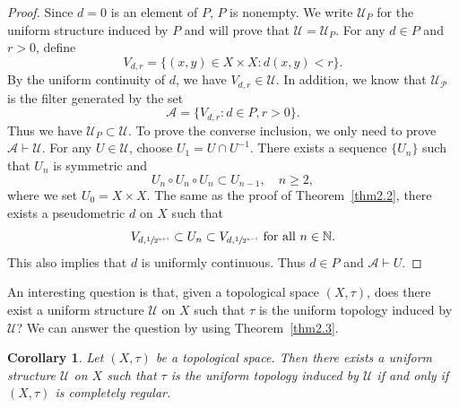 \documentclass[12pt,a4paper,draft]{article}  %
\newtheorem{corollary}{Corollary}[section]
\theoremstyle{definition}
\numberwithin{equation}{section}
\newcommand{\NN}{\mathbb{N}}
\begin{document}
\begin{proof}
    Since $d=0$ is an element of $P$, $P$ is nonempty.
    We write $\mathcal{U}_P$ for the uniform structure induced by $P$
    and will prove that $\mathcal{U}=\mathcal{U}_P$.
    For any $d \in P$ and $r > 0$, define
    $$ V_{d,r} = \{(x,y) \in X \times X: d(x,y) < r\}. $$
    By the uniform continuity of $d$, we have $V_{d,r} \in \mathcal{U}$.
    In addition, we know that $\mathcal{U_P}$ is the filter generated by the set
    $$ \mathcal{A}=\{V_{d,r}: d \in P, r > 0\}. $$
    Thus we have $\mathcal{U}_P \subset \mathcal{U}$.
    To prove the converse inclusion, we only need to prove~$\mathcal{A} \vdash \mathcal{U}$.
    For any $U \in \mathcal{U}$, choose $U_1=U \cap U^{-1}$. 
    There exists a sequence $\{U_n\}$ such that $U_n$ is symmetric and
    $$ U_{n} \circ U_{n} \circ U_{n} \subset U_{n-1}, \quad n \geq 2, $$
    where we set $U_0 = X \times X$.
    The same as the proof of Theorem~\eqref{thm2.2}, there exists a pseudometric $d$ on $X$ such that
    $$ V_{d,\sfrac{1}{2^{n+1}}} \subset U_n \subset V_{d,\sfrac{1}{2^{n-1}}} \text{ for all } n \in \NN. $$
    This also implies that $d$ is uniformly continuous.
    Thus $d \in P$ and $ \mathcal{A} \vdash U $.
\end{proof}
An interesting question is that, given a topological space $(X,\tau)$,
does there exist a uniform structure $\mathcal{U}$ on $X$ such that $\tau$ is the uniform topology induced by $\mathcal{U}$?
We can answer the question by using Theorem~\eqref{thm2.3}.
\begin{corollary} \label{cor2.4}
    Let $(X,\tau)$ be a topological space.
    Then there exists a uniform structure $\mathcal{U}$ on $X$ such that $\tau$ is the uniform topology induced by $\mathcal{U}$ if and only if $(X,\tau)$ is completely regular.   
\end{corollary}
\end{document}
